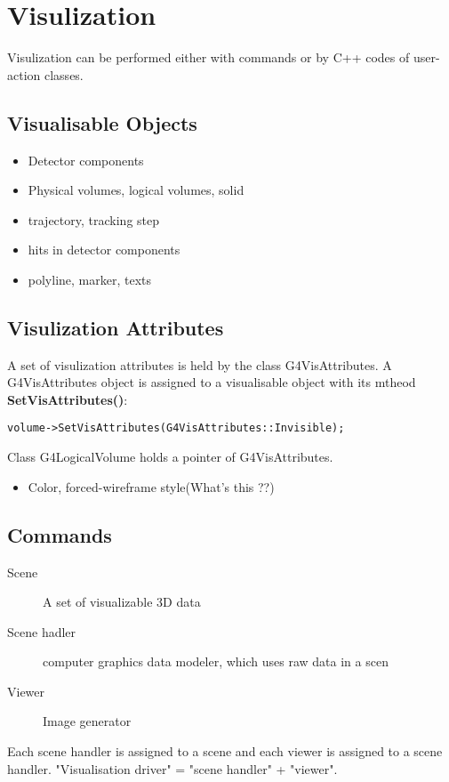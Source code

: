 \section{Visulization}
Visulization can be performed either with commands or by C++ codes of
user-action classes.
\subsection{Visualisable Objects}
\begin{itemize}
    \item Detector components
    \item Physical volumes, logical volumes, solid
    \item trajectory, tracking step
    \item hits in detector components
    \item polyline, marker, texts
\end{itemize}

\subsection{Visulization Attributes}
A set of visulization attributes is held by the class G4VisAttributes.
A G4VisAttributes object is assigned to a visualisable object with its
mtheod \textbf{SetVisAttributes()}:
\begin{verbatim}
volume->SetVisAttributes(G4VisAttributes::Invisible);
\end{verbatim}
Class G4LogicalVolume holds a pointer of G4VisAttributes.

\begin{itemize}
    \item Color, forced-wireframe style(What's this ??)
\end{itemize}

\subsection{Commands}
\begin{description}
    \item[Scene]    A set of visualizable 3D data
    \item[Scene hadler]	computer graphics data modeler, which uses raw data
	in a scen
    \item[Viewer] Image generator
\end{description}
Each scene handler is assigned to a scene and each viewer is assigned to a
scene handler. "Visualisation driver" = "scene handler" + "viewer".

